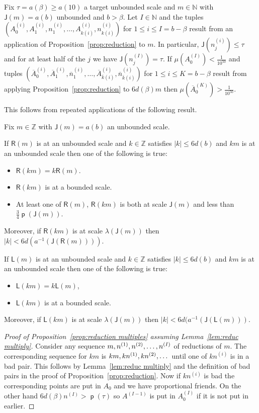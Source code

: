 \documentclass[AHL,Unicode,longabstracts,published]{cedram}
\DeclareMathOperator{\p}{\mathsf{p}}
\newcommand{\N}{\mathbb{N}}
\newcommand{\Z}{\mathbb{Z}}
\newcommand{\lft}{\mathsf{L}}
\newcommand{\rht}{\mathsf{R}}
\newcommand{\scl}{\mathsf{J}}
\begin{document}
\begin{prop}\label{prop:reduction multiples}
Fix $\tau=a(\beta) \ge a(10)$ a target unbounded scale and $m \in \N$ with $\scl(m)=a(b)$ unbounded and $b>\beta$. Let $I \in \N$ and the tuples $(A^{(i)}_0, A^{(i)}_1, n^{(i)}_1,\dots, A^{(i)}_{k(i)}, n^{(i)}_{k(i)})$ for $1 \le i \le I=b-\beta$ result from an application of Proposition~\ref{prop:reduction} to $m$. In particular, $\scl(n_j^{(i)}) \leq \tau$ and for at least half of the $j$ we have $\scl(n_j^{(I)})=\tau$. If $\mu(A^{(I)}_0)<\frac 1 {10^{50}}$ and tuples $(\overline{A}^{(i)}_0, \overline{A}^{(i)}_1, \overline{n}^{(i)}_1,\dots, \overline{A}^{(i)}_{\overline{k}(i)}, \overline{n}^{(i)}_{\overline{k}(i)})$ for $1 \le i \le K = b-\beta$ result from applying Proposition~\ref{prop:reduction} to $6d(\beta) m$ then $\mu(\overline{A}^{(K)}_0)>\frac 1 {10^{50}}$.
\end{prop}

This follows from repeated applications of the following result.

\begin{lemm}\label{lem:reduc multiply}
Fix $m \in \Z$ with $\scl(m) = a(b)$ an unbounded scale.

If $\rht(m)$ is at an unbounded scale and $k \in \Z$ satisfies $|k|\leq 6d(b)$ and $km$ is at an unbounded scale then one of the following is true:
\begin{itemize}
\item $\rht(km)=k\rht(m)$.
\item $\rht(km)$ is at a bounded scale.
\item At least one of $\rht(m)$, $\rht(km)$ is both at scale $\scl(m)$ and less than $\frac{3}{4} \p(\scl(m))$.
\end{itemize}
Moreover, if $\rht(km)$ is at scale $\lambda(\scl(m))$ then $|k| < 6d(a^{-1}(\scl(\rht(m))))$.

\pagebreak
If $\lft(m)$ is at an unbounded scale and $k \in \Z$ satisfies $|k|\leq 6d(b)$ and $km$ is at an unbounded scale then one of the following is true:
\begin{itemize}
\item $\lft(km) = k\lft(m)$,
\item $\lft(km)$ is at a bounded scale.
\end{itemize}
Moreover, if $\lft(km)$ is at scale $\lambda(\scl(m))$ then $|k| < 6d(a^{-1}(\scl(\lft(m)))$.
\end{lemm}
\begin{proof}[Proof of Proposition~\ref{prop:reduction multiples} assuming Lemma~\ref{lem:reduc multiply}]
Consider any sequence $m, n^{(1)},\linebreak n^{(2)},\dots,n^{(I)}$ of reductions of $m$. The corresponding sequence for $km$ is $km,kn^{(1)},\linebreak kn^{(2)},\dots$ until one of $kn^{(i)}$ is in a bad pair. This follows by Lemma~\ref{lem:reduc multiply} and the definition of bad pairs in the proof of Proposition~\ref{prop:reduction}. Now if $kn^{(i)}$ is bad the corresponding points are put in $A_0$ and we have proportional friends. On the other hand $6d(\beta) n^{(I)} > \p(\tau)$ so $A^{(I-1)}$ is put in $A_0^{(I)}$ if it is not put in earlier.
\end{proof}
\end{document}

